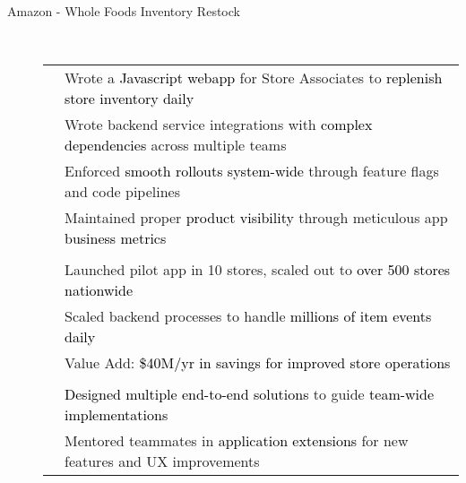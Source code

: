 \documentclass[11pt]{article}
\begin{document}
\begin{description}
\begin{description}
                \item[Amazon - Whole Foods Inventory Restock] \hfill \\
                \textcolor{gray}{
                    \begin{tabularx}{\linewidth}{>{\centering\arraybackslash}l|X}
                        \multirow{4}{*}{\textcolor{black}{Application}}
                            & Wrote a \textcolor{black}{Javascript webapp} for Store Associates to \textcolor{black}{replenish store inventory daily}\\
                            & Wrote backend service integrations with \textcolor{black}{complex dependencies} across multiple teams\\
                            & Enforced \textcolor{black}{smooth rollouts system-wide} through feature flags and code pipelines \\
                            & Maintained proper \textcolor{black}{product visibility} through meticulous app \textcolor{black}{business metrics} \\
                        \\
                        \multirow{3}{*}{\textcolor{black}{Scaling}}
                            & Launched pilot app in 10 stores, scaled out to \textcolor{black}{over 500 stores nationwide}\\
                            & Scaled backend processes to handle \textcolor{black}{millions of item events daily}\\
                            & Value Add: \textcolor{black}{\$40M/yr in savings for improved store operations}\\
                        \\
                        \multirow{2}{*}{\textcolor{black}{Leadership}}
                            & \textcolor{black}{Designed multiple end-to-end solutions} to guide \textcolor{black}{team-wide implementations}\\
                            & Mentored teammates in \textcolor{black}{application extensions} for new features and UX improvements\\
                    \end{tabularx}
                }


\end{description}
\end{description}
\end{document}
